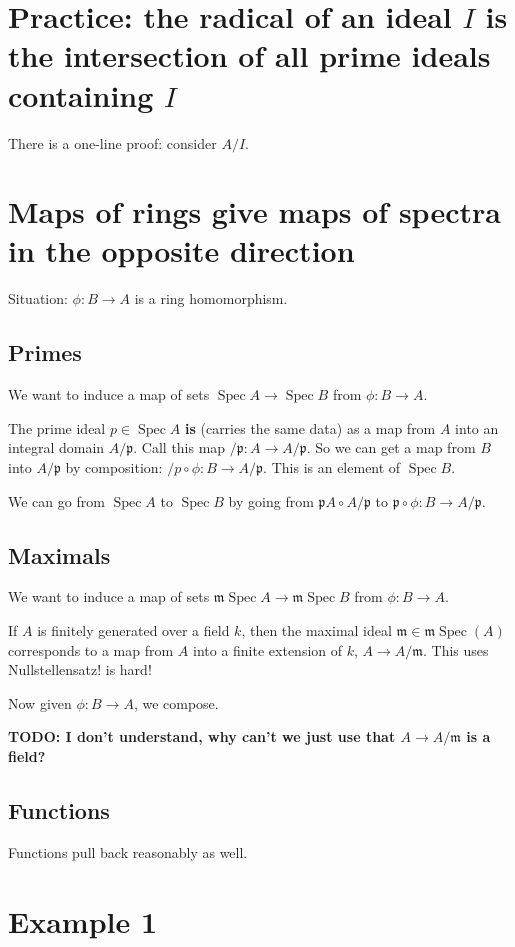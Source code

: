 \documentclass{book}
\newcommand{\spec}{\operatorname{Spec}}
\newcommand{\m}{\mathfrak{m}}
\newcommand{\p}{\mathfrak{p}}
\theoremstyle{definition}
\begin{document}
\section{Practice: the radical of an ideal $I$ is the intersection of all prime ideals containing $I$}
There is a one-line proof: consider $A/I$.
\section{Maps of rings give maps of spectra in the opposite direction}

Situation: $\phi: B \rightarrow A$ is a ring homomorphism. 
\subsection{Primes}
We want to induce a map of sets $\spec A \rightarrow \spec B$ from
$\phi: B \rightarrow A$.

The prime ideal $p \in \spec A$ \textbf{is} (carries the same data) as a map from
$A$ into an integral domain $A/\p$. Call this map $/\p: A \rightarrow A /\p$.
So we can get a map from $B$ into $A/\p$ by composition: $/p \circ \phi : B \rightarrow A/\p$.
This is an element of $\spec B$.

We can go from $\spec A$ to $\spec B$ by going from
$\p A \circ A/\p$ to $\p \circ \phi: B \rightarrow A/\p$.

\subsection{Maximals}
We want to induce a map of sets $\m\spec A \rightarrow \m\spec B$ from
$\phi: B \rightarrow A$.

If $A$ is finitely generated over a field $k$, then the maximal
ideal $\m \in \m\spec(A)$ corresponds to a map from $A$ into a finite extension of $k$,
$A \rightarrow A/\m$. This uses Nullstellensatz! is hard!


Now given $\phi: B \rightarrow A$, we compose.


\textbf{TODO: I don't understand, why can't we just use that $A \rightarrow A/\m$ is a field?}

\subsection{Functions}

Functions pull back reasonably as well.

\section{Example 1 }
\end{document}
